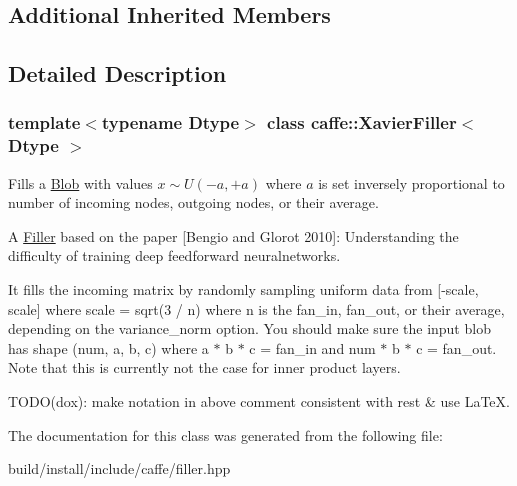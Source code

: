 \subsection*{Additional Inherited Members}


\subsection{Detailed Description}
\subsubsection*{template$<$typename Dtype$>$\newline
class caffe\+::\+Xavier\+Filler$<$ Dtype $>$}

Fills a \mbox{\hyperlink{classcaffe_1_1_blob}{Blob}} with values $ x \sim U(-a, +a) $ where $ a $ is set inversely proportional to number of incoming nodes, outgoing nodes, or their average. 

A \mbox{\hyperlink{classcaffe_1_1_filler}{Filler}} based on the paper \mbox{[}Bengio and Glorot 2010\mbox{]}\+: Understanding the difficulty of training deep feedforward neuralnetworks.

It fills the incoming matrix by randomly sampling uniform data from \mbox{[}-\/scale, scale\mbox{]} where scale = sqrt(3 / n) where n is the fan\+\_\+in, fan\+\_\+out, or their average, depending on the variance\+\_\+norm option. You should make sure the input blob has shape (num, a, b, c) where a $\ast$ b $\ast$ c = fan\+\_\+in and num $\ast$ b $\ast$ c = fan\+\_\+out. Note that this is currently not the case for inner product layers.

T\+O\+D\+O(dox)\+: make notation in above comment consistent with rest \& use La\+TeX. 

The documentation for this class was generated from the following file\+:\begin{DoxyCompactItemize}
\item 
build/install/include/caffe/filler.\+hpp\end{DoxyCompactItemize}
